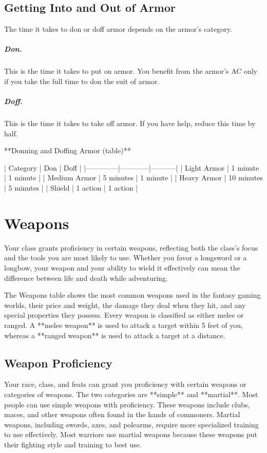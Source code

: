 \subsection{Getting Into and Out of Armor}

The time it takes to don or doff armor depends on the armor's category.

\subparagraph*{Don.} This is the time it takes to put on armor. You benefit from the armor's AC only if you take the full time to don the suit of armor.

\subparagraph*{Doff.} This is the time it takes to take off armor. If you have help, reduce this time by half.

**Donning and Doffing Armor (table)**

| Category     | Don        | Doff      |
|--------------|------------|-----------|
| Light Armor  | 1 minute   | 1 minute  |
| Medium Armor | 5 minutes  | 1 minute  |
| Heavy Armor  | 10 minutes | 5 minutes |
| Shield       | 1 action   | 1 action  |

\section{Weapons}

Your class grants proficiency in certain weapons, reflecting both the class's focus and the tools you are most likely to use. Whether you favor a longsword or a longbow, your weapon and your ability to wield it effectively can mean the difference between life and death while adventuring.

The Weapons table shows the most common weapons used in the fantasy gaming worlds, their price and weight, the damage they deal when they hit, and any special properties they possess. Every weapon is classified as either melee or ranged. A **melee weapon** is used to attack a target within 5 feet of you, whereas a **ranged weapon** is used to attack a target at a distance.

\subsection{Weapon Proficiency}

Your race, class, and feats can grant you proficiency with certain weapons or categories of weapons. The two categories are **simple** and **martial**. Most people can use simple weapons with proficiency. These weapons include clubs, maces, and other weapons often found in the hands of commoners. Martial weapons, including swords, axes, and polearms, require more specialized training to use effectively. Most warriors use martial weapons because these weapons put their fighting style and training to best use.

